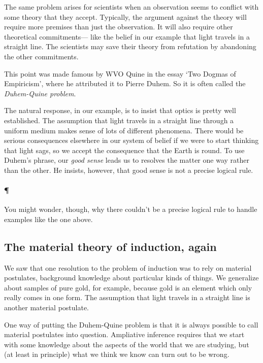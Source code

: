 \documentclass[]{article}
\newcommand*{\newbit}{\paragraph{\P}}
\begin{document}
The same problem arises for scientists when an observation seems to conflict with some theory that they accept. Typically, the argument against the theory will require more premises than just the observation. It will also require other theoretical commitments--- like the belief in our example that light travels in a straight line. The scientists may save their theory from refutation by abandoning the other commitments.

This point was made famous by WVO Quine in the essay `Two Dogmas of Empiricism', where he attributed it to Pierre Duhem. So it is often called the \emph{Duhem-Quine problem}. 

The natural response, in our example, is to insist that optics is pretty well established. The assumption that light travels in a straight line through a uniform medium makes sense of lots of different phenomena. There would be serious consequences elsewhere in our system of belief if we were to start thinking that light sags, so we accept the consequence that the Earth is round. To use Duhem's phrase, our \emph{good sense} leads us to resolves the matter one way rather than the other. He insists, however, that good sense is not a precise logical rule.

\newbit You might wonder, though, why there couldn't be a precise logical rule to handle examples like the one above.



\subsection{The material theory of induction, again}

We saw that one resolution to the problem of induction was to rely on material postulates, background knowledge about particular kinds of things. We generalize about samples of pure gold, for example, because gold is an element which only really comes in one form. The assumption that light travels in a straight line is another material postulate.

One way of putting the Duhem-Quine problem is that it is always possible to call material postulates into question. Ampliative inference requires that we start with some knowledge about the aspects of the world that we are studying, but (at least in principle) what we think we know can turn out to be wrong.



\label{theend}
\end{document}
